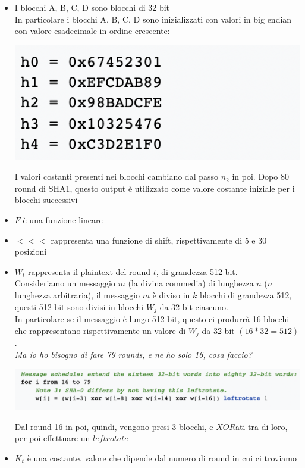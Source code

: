 \documentclass[11pt, oneside]{article}   	%
\begin{document}
\begin{itemize}
\item I blocchi A, B, C, D sono blocchi di 32 bit\\
In particolare i blocchi A, B, C, D sono inizializzati con valori in big endian con valore esadecimale in ordine crescente:
\begin{center}
\includegraphics[scale= 0.5]{blocks}
\end{center}
I valori costanti presenti nei blocchi cambiano dal passo $n_2$ in poi. Dopo 80 round di SHA1, questo output è utilizzato come valore costante iniziale per i blocchi successivi
\item $F$ è una funzione lineare
\item $<<<$ rappresenta una funzione di shift, rispettivamente di 5 e 30 posizioni
\item $W_t$ rappresenta il plaintext del round $t$, di grandezza 512 bit.\\
Consideriamo un messaggio $m$ (la divina commedia) di lunghezza $n$ ($n$ lunghezza arbitraria), il messaggio $m$ è diviso in $k$ blocchi di grandezza 512, questi 512 bit sono divisi in blocchi $W_j$ da 32 bit ciascuno.\\ In particolare se il messaggio è lungo 512 bit, questo ci produrrà 16 blocchi che rappresentano rispettivamente un valore di $W_j$ da 32 bit $(16*32 = 512)$.\\
\emph{Ma io ho bisogno di fare 79 rounds, e ne ho solo 16, cosa faccio?}
\begin{center}
\includegraphics[scale= 0.5]{blocks2}
\end{center}
Dal round 16 in poi, quindi, vengono presi 3 blocchi, e $XOR$ati tra di loro, per poi effettuare un $leftrotate$
\item $K_t$ è una costante, valore che dipende dal numero di round in cui ci troviamo

\end{itemize}
\end{document}
